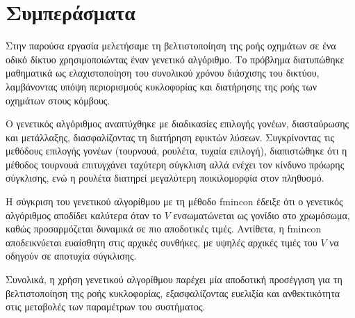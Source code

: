 \documentclass[a4paper,12pt]{article}
\begin{document}
\section*{Συμπεράσματα}

Στην παρούσα εργασία μελετήσαμε τη βελτιστοποίηση της ροής οχημάτων σε ένα οδικό δίκτυο χρησιμοποιώντας έναν 
γενετικό αλγόριθμο. Το πρόβλημα διατυπώθηκε μαθηματικά ως ελαχιστοποίηση του συνολικού χρόνου διάσχισης του 
δικτύου, λαμβάνοντας υπόψη περιορισμούς κυκλοφορίας και διατήρησης της ροής των οχημάτων στους κόμβους.

Ο γενετικός αλγόριθμος αναπτύχθηκε με διαδικασίες επιλογής γονέων, διασταύρωσης και μετάλλαξης, διασφαλίζοντας 
τη διατήρηση εφικτών λύσεων. Συγκρίνοντας τις μεθόδους επιλογής γονέων (τουρνουά, ρουλέτα, τυχαία επιλογή), 
διαπιστώθηκε ότι η μέθοδος τουρνουά επιτυγχάνει ταχύτερη σύγκλιση αλλά ενέχει τον κίνδυνο πρόωρης σύγκλισης,
ενώ η ρουλέτα διατηρεί μεγαλύτερη ποικιλομορφία στον πληθυσμό. 

Η σύγκριση του γενετικού αλγορίθμου
με τη μέθοδο fmincon έδειξε ότι ο γενετικός αλγόριθμος αποδίδει
καλύτερα όταν το $V$ ενσωματώνεται ως γονίδιο στο χρωμόσωμα, καθώς προσαρμόζεται δυναμικά σε πιο αποδοτικές 
τιμές. Αντίθετα, η fmincon αποδεικνύεται ευαίσθητη στις αρχικές 
συνθήκες, με υψηλές αρχικές τιμές του $V$ να οδηγούν σε αποτυχία σύγκλισης. 

Συνολικά, η χρήση γενετικού 
αλγορίθμου παρέχει μία αποδοτική προσέγγιση για τη βελτιστοποίηση της ροής κυκλοφορίας, εξασφαλίζοντας ευελιξία
και ανθεκτικότητα στις μεταβολές των παραμέτρων του συστήματος.
\end{document}
